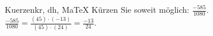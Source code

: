 \begin{MAufgabe}{Kuerzen}{kr, dh, MaTeX}
K\"urzen Sie soweit m\"oglich: $\frac{-585}{1080}$.\\ 
\ifLsg\MLoesung
\quad $\frac{-585}{1080}=\frac{(45)\cdot(-13)}{(45)\cdot(24)}=\frac{-13}{24}$.\else\relax\fi
 \end{MAufgabe}